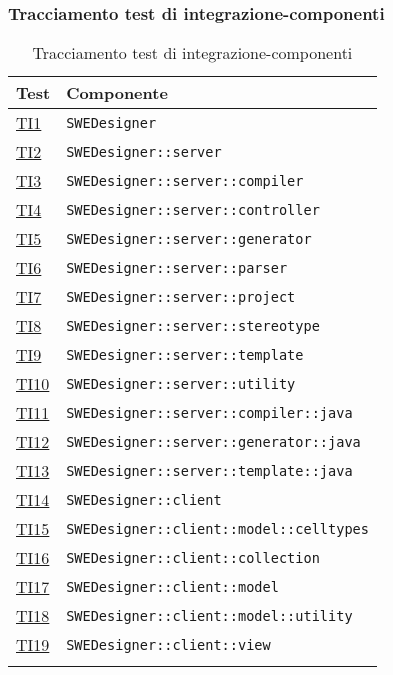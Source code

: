 \subsubsection{Tracciamento test di integrazione-componenti}
\normalsize
\begin{longtable}{|>{\centering}m{3cm}|m{9cm}<{\centering}|}
\hline 
\textbf{Test} & \textbf{Componente}\\
\hline
\endhead
\hyperlink{TI1}{TI1} & \texttt{SWEDesigner}\\ \hline
\hyperlink{TI2}{TI2} & \texttt{SWEDesigner::server}\\ \hline
\hyperlink{TI3}{TI3} & \texttt{SWEDesigner::server::compiler}\\ \hline
\hyperlink{TI4}{TI4} & \texttt{SWEDesigner::server::controller}\\ \hline
\hyperlink{TI5}{TI5} & \texttt{SWEDesigner::server::generator}\\ \hline
\hyperlink{TI6}{TI6} & \texttt{SWEDesigner::server::parser}\\ \hline
\hyperlink{TI7}{TI7} & \texttt{SWEDesigner::server::project}\\ \hline
\hyperlink{TI8}{TI8} & \texttt{SWEDesigner::server::stereotype}\\ \hline
\hyperlink{TI9}{TI9} & \texttt{SWEDesigner::server::template}\\ \hline
\hyperlink{TI10}{TI10} & \texttt{SWEDesigner::server::utility}\\ \hline
\hyperlink{TI11}{TI11} & \texttt{SWEDesigner::server::compiler::java}\\ \hline
\hyperlink{TI12}{TI12} & \texttt{SWEDesigner::server::generator::java}\\ \hline
\hyperlink{TI13}{TI13} & \texttt{SWEDesigner::server::template::java}\\ \hline
\hyperlink{TI14}{TI14} & \texttt{SWEDesigner::client}\\ \hline
\hyperlink{TI15}{TI15} & \texttt{SWEDesigner::client::model::celltypes}\\ \hline
\hyperlink{TI16}{TI16} & \texttt{SWEDesigner::client::collection}\\ \hline
\hyperlink{TI17}{TI17} & \texttt{SWEDesigner::client::model}\\ \hline
\hyperlink{TI18}{TI18} & \texttt{SWEDesigner::client::model::utility}\\ \hline
\hyperlink{TI19}{TI19} & \texttt{SWEDesigner::client::view}\\ \hline
\caption[Tracciamento test di integrazione-componenti]{Tracciamento test di integrazione-componenti}
\label{tabella:ts-requi}
\end{longtable}



